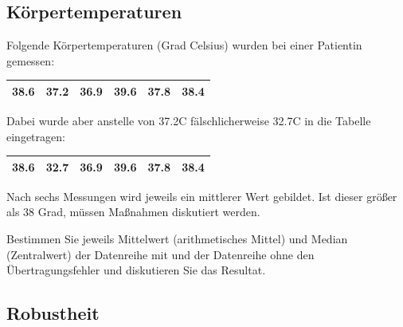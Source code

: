 \subsection{Körpertemperaturen}

Folgende Körpertemperaturen (Grad Celsius) wurden bei einer Patientin gemessen:

\begin{center}
\begin{tabular}{|c|c|c|c|c|c|}\hline
38.6 & 37.2  & 36.9 & 39.6 & 37.8 & 38.4\\\hline
 \end{tabular}
 \end{center}
 
Dabei wurde aber anstelle von 37.2\degre C fälschlicherweise 32.7\degre C in die Tabelle eingetragen:

\begin{center}
\begin{tabular}{|c|c|c|c|c|c|}\hline
38.6 & \textbf{32.7}  & 36.9 & 39.6 & 37.8 & 38.4\\\hline
 \end{tabular}
\end{center}

Nach sechs Messungen wird jeweils ein mittlerer Wert gebildet. Ist
dieser größer als 38 Grad, müssen Maßnahmen diskutiert werden.

Bestimmen Sie jeweils Mittelwert (arithmetisches Mittel) und Median
(Zentralwert) der Datenreihe mit und der Datenreihe 
ohne den Übertragungsfehler und diskutieren Sie das Resultat.



\subsection{Robustheit}


